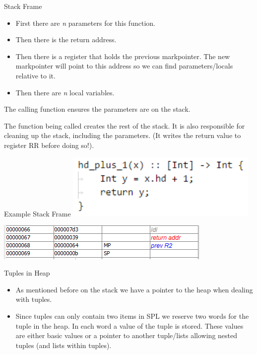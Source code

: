 \documentclass[10pt]{beamer}
\begin{document}
\begin{frame}{Stack Frame}
    \begin{itemize}
        \item First there are \textit{n} parameters for this function.
        \item Then there is the return address.
        \item Then there is a register that holds the previous markpointer. The new markpointer will point to this address so we can find parameters/locals relative to it.
        \item Then there are \textit{n} local variables.
    \end{itemize}
    The calling function ensures the parameters are on the stack.
    
    The function being called creates the rest of the stack. It is also responsible for cleaning up the stack, including the parameters. (It writes the return value to register RR before doing so!).
\end{frame}

\begin{frame}{Example Stack Frame}
    \includegraphics[width=0.7\textwidth]{presentation3/1.png}

    \includegraphics[width=\textwidth]{presentation3/2.png}
\end{frame}

\begin{frame}{Tuples in Heap}
    \begin{itemize}
        \item As mentioned before on the stack we have a pointer to the heap when dealing with tuples.
        \item Since tuples can only contain two items in SPL we reserve two words for the tuple in the heap. In each word a value of the tuple is stored. These values are either basic values or a pointer to another tuple/lists allowing nested tuples (and lists within tuples).
    \end{itemize}
\end{frame}
\end{document}
